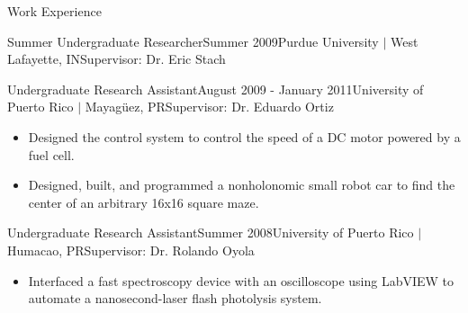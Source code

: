 \documentclass{resume} %
\begin{document}
\begin{rSection}{Work Experience}
\begin{rSubsection}{Summer Undergraduate Researcher}{Summer 2009}{Purdue University $\vert$ West Lafayette, IN}{Supervisor: Dr. Eric Stach}
\end{rSubsection}


\begin{rSubsection}{Undergraduate Research Assistant}{August 2009 - January 2011}{University of Puerto Rico $\vert$ Mayag\"{u}ez, PR}{Supervisor: Dr. Eduardo Ortiz}

\item
\begin{itemize}
\item Designed the control system to control the speed of a DC motor powered by
  a fuel cell.
\item Designed, built, and programmed a nonholonomic small robot car to find the
  center of an arbitrary 16x16 square maze.
\end{itemize}

\end{rSubsection}


\begin{rSubsection}{Undergraduate Research Assistant}{Summer 2008}{University of Puerto Rico $\vert$ Humacao, PR}{Supervisor: Dr. Rolando Oyola}

\item
\begin{itemize}
\item Interfaced a fast spectroscopy device with an oscilloscope using LabVIEW
  to automate a nanosecond-laser flash photolysis system.
\end{itemize}

\end{rSubsection}


\end{rSection}







\end{document}
